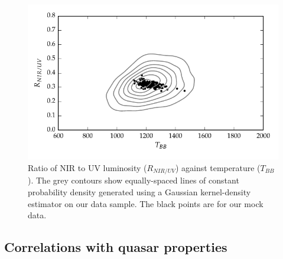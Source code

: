 \begin{figure}
  \centering
  \includegraphics[width=\textwidth]{figures/chapter05/ratio_tbb_contours.pdf}
  \caption[{Ratio of NIR to UV luminosity ($R_{NIR/UV}$) against temperature ($T_{BB}$).}]{Ratio of NIR to UV luminosity ($R_{NIR/UV}$) against temperature ($T_{BB}$). The grey contours show equally-spaced lines of constant probability density generated using a Gaussian kernel-density estimator on our data sample. The black points are for our mock data.}
  \label{fig:ratio_tbb_contours}
\end{figure}

\subsection{Correlations with quasar properties}

